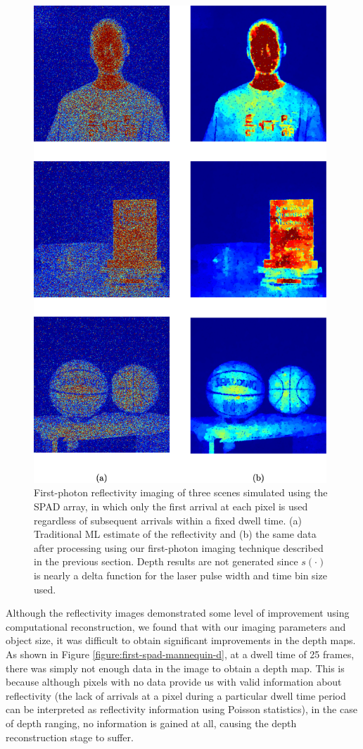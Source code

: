 \begin{figure}[h!]
\centerline{\includegraphics[width=11cm]{figure-first-spad-first-i.pdf}}
\caption{First-photon reflectivity imaging of three scenes simulated using the SPAD array, in which only the first arrival at each pixel is used regardless of subsequent arrivals within a fixed dwell time. (a) Traditional ML estimate of the reflectivity and (b) the same data after processing using our first-photon imaging technique described in the previous section. Depth results are not generated since $s(\cdot)$ is nearly a delta function for the laser pulse width and time bin size used.}
\label{figure:first-spad-first-i}
\end{figure}

Although the reflectivity images demonstrated some level of improvement using computational reconstruction, we found that with our imaging parameters and object size, it was difficult to obtain significant improvements in the depth maps. As shown in Figure \ref{figure:first-spad-mannequin-d}, at a dwell time of 25 frames, there was simply not enough data in the image to obtain a depth map. This is because although pixels with no data provide us with valid information about reflectivity (the lack of arrivals at a pixel during a particular dwell time period can be interpreted as reflectivity information using Poisson statistics), in the case of depth ranging, no information is gained at all, causing the depth reconstruction stage to suffer.

